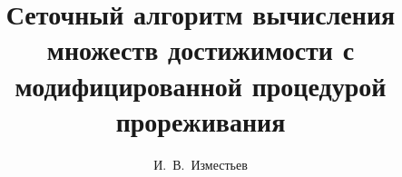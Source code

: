 

\usepackage{todonotes} %

\usepackage[russian]{nla}

%
%


%




%
\fi

\title{Сеточный алгоритм вычисления множеств достижимости с модифицированной процедурой прореживания}
\author{И.~В.~Изместьев  %
} %


\maketitle

